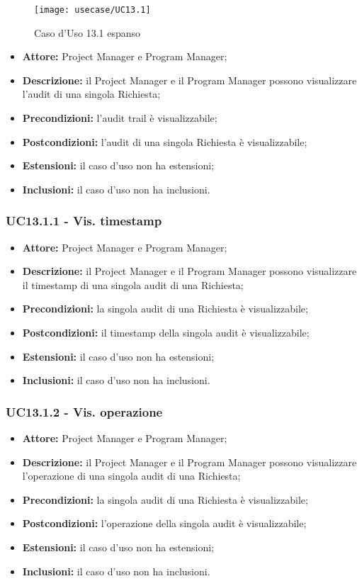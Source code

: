 \begin{figure}[H] 
    \centering 
    \texttt{[image: usecase/UC13.1]} 
    \caption{Caso d'Uso 13.1 espanso}
\end{figure}

\begin{itemize}[label=$\circ$]
\item \textbf{Attore:} Project Manager e Program Manager;
\item \textbf{Descrizione:} il Project Manager e il Program Manager possono visualizzare l'audit di una singola Richiesta;
\item \textbf{Precondizioni:} l'audit trail è visualizzabile;
\item \textbf{Postcondizioni:} l'audit di una singola Richiesta è visualizzabile;
\item \textbf{Estensioni:} il caso d'uso non ha estensioni;
\item \textbf{Inclusioni:} il caso d'uso non ha inclusioni.
\end{itemize}

\subsubsection*{UC13.1.1 - Vis. timestamp}
\begin{itemize}[label=$\circ$]
\item \textbf{Attore:} Project Manager e Program Manager;
\item \textbf{Descrizione:} il Project Manager e il Program Manager possono visualizzare il timestamp di una singola audit di una Richiesta;
\item \textbf{Precondizioni:} la singola audit di una Richiesta è visualizzabile;
\item \textbf{Postcondizioni:} il timestamp della singola audit è visualizzabile;
\item \textbf{Estensioni:} il caso d'uso non ha estensioni;
\item \textbf{Inclusioni:} il caso d'uso non ha inclusioni.
\end{itemize}

\subsubsection*{UC13.1.2 - Vis. operazione}
\begin{itemize}[label=$\circ$]
\item \textbf{Attore:} Project Manager e Program Manager;
\item \textbf{Descrizione:} il Project Manager e il Program Manager possono visualizzare l'operazione di una singola audit di una Richiesta;
\item \textbf{Precondizioni:} la singola audit di una Richiesta è visualizzabile;
\item \textbf{Postcondizioni:} l'operazione della singola audit è visualizzabile;
\item \textbf{Estensioni:} il caso d'uso non ha estensioni;
\item \textbf{Inclusioni:} il caso d'uso non ha inclusioni.
\end{itemize}

